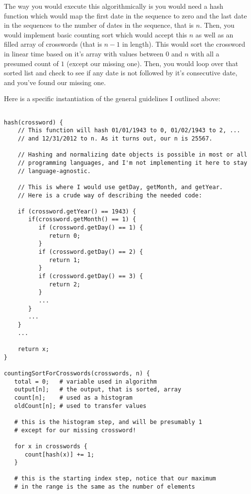 \documentclass[11pt]{article}
\begin{document}
The way you would execute this algorithmically is you would need a hash function
which would map the first date in the sequence to zero and the last date in the
sequences to the number of dates in the sequence, that is $n$. Then, you would
implement basic counting sort which would accept this $n$ as well as an filled
array of crosswords (that is $n - 1$ in length). This would sort the crossword
in linear time based on it's array with values between $0$ and $n$ with all
a presumed count of $1$ (except our missing one). Then, you would loop over that
sorted list and check to see if any date is not followed by it's consecutive date,
and you've found our missing one.

Here is a specific instantiation of the general guidelines I outlined above:

\begin{verbatim}

hash(crossword) {
    // This function will hash 01/01/1943 to 0, 01/02/1943 to 2, ... 
    // and 12/31/2012 to n. As it turns out, our n is 25567.
    
    // Hashing and normalizing date objects is possible in most or all 
    // programming languages, and I'm not implementing it here to stay
    // language-agnostic.
    
    // This is where I would use getDay, getMonth, and getYear.
    // Here is a crude way of describing the needed code:
    
    if (crossword.getYear() == 1943) {
       if(crossword.getMonth() == 1) {
          if (crossword.getDay() == 1) {
             return 0;
          }
          if (crossword.getDay() == 2) {
             return 1;
          }
          if (crossword.getDay() == 3) {
             return 2;
          }
          ...
       }
       ...
    }
    ...
    
    return x;
}

countingSortForCrosswords(crosswords, n) {
   total = 0;   # variable used in algorithm
   output[n];   # the output, that is sorted, array
   count[n];    # used as a histogram 
   oldCount[n]; # used to transfer values

   # this is the histogram step, and will be presumably 1
   # except for our missing crossword!
   
   for x in crosswords {
      count[hash(x)] += 1;
   }
   
   # this is the starting index step, notice that our maximum
   # in the range is the same as the number of elements
   

\end{verbatim}
\end{document}
